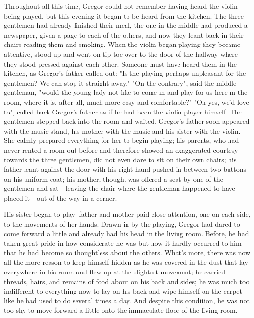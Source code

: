 Throughout all this time, Gregor could not remember having heard the violin being played, but this evening it began to be heard from the kitchen. The three gentlemen had already finished their meal, the one in the middle had produced a newspaper, given a page to each of the others, and now they leant back in their chairs reading them and smoking. When the violin began playing they became attentive, stood up and went on tip-toe over to the door of the hallway where they stood pressed against each other. Someone must have heard them in the kitchen, as Gregor's father called out: "Is the playing perhaps unpleasant for the gentlemen? We can stop it straight away." "On the contrary", said the middle gentleman, "would the young lady not like to come in and play for us here in the room, where it is, after all, much more cosy and comfortable?" "Oh yes, we'd love to", called back Gregor's father as if he had been the violin player himself. The gentlemen stepped back into the room and waited. Gregor's father soon appeared with the music stand, his mother with the music and his sister with the violin. She calmly prepared everything for her to begin playing; his parents, who had never rented a room out before and therefore showed an exaggerated courtesy towards the three gentlemen, did not even dare to sit on their own chairs; his father leant against the door with his right hand pushed in between two buttons on his uniform coat; his mother, though, was offered a seat by one of the gentlemen and sat - leaving the chair where the gentleman happened to have placed it - out of the way in a corner.

His sister began to play; father and mother paid close attention, one on each side, to the movements of her hands. Drawn in by the playing, Gregor had dared to come forward a little and already had his head in the living room. Before, he had taken great pride in how considerate he was but now it hardly occurred to him that he had become so thoughtless about the others. What's more, there was now all the more reason to keep himself hidden as he was covered in the dust that lay everywhere in his room and flew up at the slightest movement; he carried threads, hairs, and remains of food about on his back and sides; he was much too indifferent to everything now to lay on his back and wipe himself on the carpet like he had used to do several times a day. And despite this condition, he was not too shy to move forward a little onto the immaculate floor of the living room.

